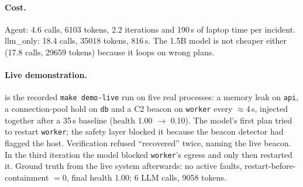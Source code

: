 \documentclass[11pt,a4paper]{article}
\newcommand{\code}[1]{\texttt{#1}}
\begin{document}
\paragraph{Cost.} Agent: 4.6 calls, \num{6103} tokens, 2.2 iterations and 190\,s of laptop time per
incident. llm\_only: 18.4 calls, \num{35018} tokens, 816\,s. The 1.5B model is not cheaper either
(17.8 calls, \num{29659} tokens) because it loops on wrong plans.

\paragraph{Live demonstration.}  is the recorded \code{make demo-live} run on five
real processes: a memory leak on \code{api}, a connection-pool hold on \code{db} and a C2 beacon on
\code{worker} every $\approx$4\,s, injected together after a 35\,s baseline (health 1.00 $\to$ 0.10).
The model's first plan tried to restart \code{worker}; the safety layer blocked it because the beacon
detector had flagged the host. Verification refused ``recovered'' twice, naming the live beacon. In
the third iteration the model blocked \code{worker}'s egress and only then restarted it. Ground truth
from the live system afterwards: no active faults, restart-before-containment $=0$, final health 1.00;
6 LLM calls, \num{9058} tokens.
\end{document}
